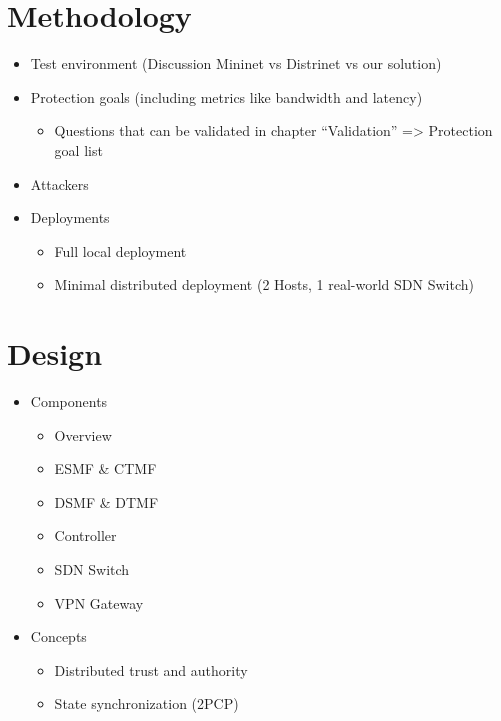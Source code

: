 \documentclass{article}
\begin{document}
\section{Methodology}
\begin{itemize}
    \item Test environment (Discussion Mininet vs Distrinet vs our solution)
    \item Protection goals (including metrics like bandwidth and latency)
    \begin{itemize}
        \item Questions that can be validated in chapter “Validation” => Protection goal list
    \end{itemize}
    \item Attackers
    \item Deployments
    \begin{itemize}
        \item Full local deployment
        \item Minimal distributed deployment (2 Hosts, 1 real-world SDN Switch)
    \end{itemize}
\end{itemize}

\section{Design}
\begin{itemize}
    \item Components
    \begin{itemize}
        \item Overview
        \item ESMF \& CTMF
        \item DSMF \& DTMF
        \item Controller
        \item SDN Switch
        \item VPN Gateway
    \end{itemize}
    \item Concepts
    \begin{itemize}
        \item Distributed trust and authority
        \item State synchronization (2PCP)
    \end{itemize}
\end{itemize}
\end{document}
